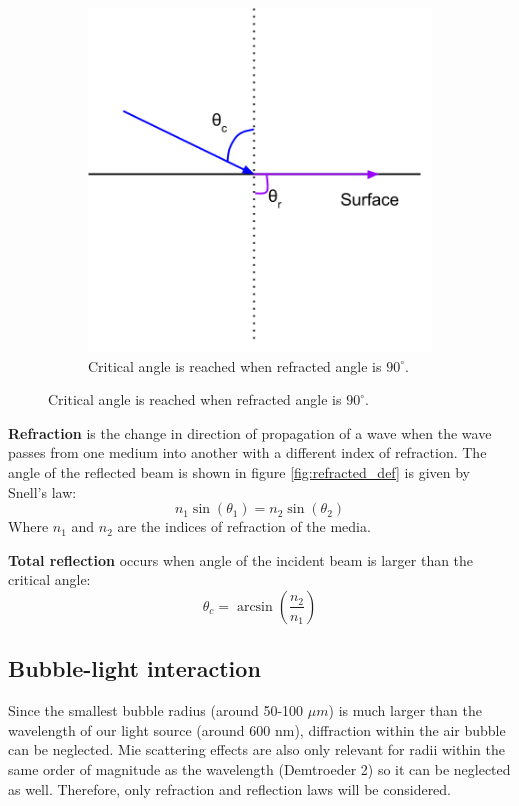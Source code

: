 \begin{figure}
		    \begin{subfigure}[t]{0.3\textwidth}
		        \includegraphics[width=\textwidth]{images/total_reflection.png}
		        \caption{Critical angle is reached when refracted angle is $90^\circ$.}
		        \label{fig:total_reflected_def}
		    \end{subfigure}
	 		\end{figure}	
			
			\textbf{Refraction} is the change in direction of propagation of a wave when the wave passes from one medium into another with a different index of refraction. The angle of the reflected beam is shown in figure \ref{fig:refracted_def} is given by Snell's law:
			\begin{equation}
				n_1 \sin(\theta_1) = n_2 \sin(\theta_2)
			\end{equation}
				Where $n_1$ and $n_2$ are the indices of refraction of the media.
				
				\textbf{Total reflection} occurs when angle of the incident beam is larger than the critical angle:
				\begin{equation}
					\theta_c = \arcsin\left(\dfrac{n_2}{n_1}\right)
				\end{equation}
				
				
		\subsection{Bubble-light interaction}
			Since the smallest bubble radius (around 50-100 $\mu m$) is much larger than the wavelength of our light source (around 600 nm), diffraction within the air bubble can be neglected. Mie scattering effects are also only relevant for radii within the same order of magnitude as the wavelength (Demtroeder 2) so it can be neglected as well. Therefore, only refraction and reflection laws will be considered. 
			

